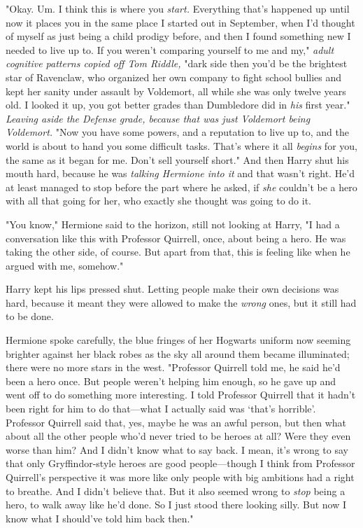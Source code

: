 "Okay. Um. I think this is where you \emph{start.} Everything that's happened
up until now{\el} it places you in the same place I started out in
September, when I'd thought of myself as just being a child prodigy before, and
then I found something new I needed to live up to. If you weren't comparing
yourself to me and my," \emph{adult cognitive patterns copied off Tom Riddle,}
"dark side{\el} then you'd be the brightest star of Ravenclaw, who organized
her own company to fight school bullies and kept her sanity under assault by
Voldemort, all while she was only twelve years old. I looked it up, you got
better grades than Dumbledore did in \emph{his} first year." \emph{Leaving
aside the Defense grade, because that was just Voldemort being Voldemort.} "Now
you have some powers, and a reputation to live up to, and the world is about to
hand you some difficult tasks. That's where it all \emph{begins} for you, the
same as it began for me. Don't sell yourself short." And then Harry shut his
mouth hard, because he was \emph{talking Hermione into it} and that wasn't
right. He'd at least managed to stop before the part where he asked, if
\emph{she} couldn't be a hero with all that going for her, who exactly she
thought was going to do it.

"You know," Hermione said to the horizon, still not looking at Harry, "I had a
conversation like this with Professor Quirrell, once, about being a hero. He
was taking the other side, of course. But apart from that, this is feeling like
when he argued with me, somehow."

Harry kept his lips pressed shut. Letting people make their own decisions was
hard, because it meant they were allowed to make the \emph{wrong} ones, but it
still had to be done.

Hermione spoke carefully, the blue fringes of her Hogwarts uniform now seeming
brighter against her black robes as the sky all around them became illuminated;
there were no more stars in the west. "Professor Quirrell told me, he said he'd
been a hero once. But people weren't helping him enough, so he gave up and went
off to do something more interesting. I told Professor Quirrell that it hadn't
been right for him to do that—what I actually said was `that's horrible'.
Professor Quirrell said that, yes, maybe he was an awful person, but then what
about all the other people who'd never tried to be heroes at all? Were they
even worse than him? And I didn't know what to say back. I mean, it's wrong to
say that only Gryffindor-style heroes are good people—though I think from
Professor Quirrell's perspective it was more like only people with big
ambitions had a right to breathe. And I didn't believe that. But it also seemed
wrong to \emph{stop} being a hero, to walk away like he'd done. So I just stood
there looking silly. But now I know what I should've told him back then."

